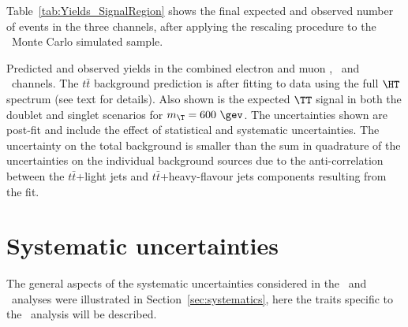 Table~\ref{tab:Yields_SignalRegion} shows the final expected and
observed number of events in the three channels, after applying the rescaling
procedure to the \ttbar\ Monte Carlo simulated sample.

\begin{table}[tb]\centering

\caption{Predicted and observed yields in the combined 
electron and muon \chii, \chiii\ and \chiv\ channels. 
The $t\bar{t}$ background prediction is after fitting to data 
using the full $\HT$ spectrum (see text for details).
Also shown is the expected $\TT$ signal in both the doublet 
and singlet scenarios for $m_{\T}=600~\gev$. 
The uncertainties shown 
are post-fit and include the effect of 
statistical and systematic uncertainties. 
The uncertainty on the total background is smaller 
than the sum in quadrature of the uncertainties on the individual background
sources due to the anti-correlation between the $t\bar{t}$+light 
jets and $t\bar{t}$+heavy-flavour jets components resulting from 
the fit.\label{tab:Yields_SignalRegion}}
\end{table}


\section{Systematic uncertainties}\label{sec:htxSYS}

The general aspects of the systematic uncertainties considered
in the \wbx\ and \htx\ analyses were illustrated
in Section~\ref{sec:systematics}, here the traits specific to the
\htx\ analysis will be described.


